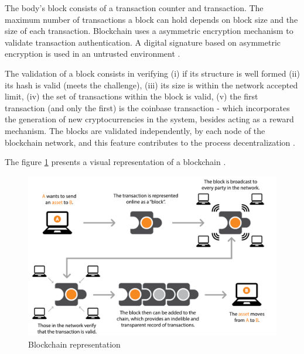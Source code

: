 The body's block consists of a transaction counter and transaction. The maximum number of transactions a block can hold depends on block size and the size of each transaction. Blockchain uses a asymmetric encryption mechanism to validate transaction authentication. A digital signature based on asymmetric encryption is used in an untrusted environment \cite{zheng2016blockchain}.

The validation of a block consists in verifying (i) if its structure is well formed (ii) its hash is valid (meets the challenge), (iii) its size is within the network accepted limit, (iv) the set of transactions within the block is valid, (v) the first transaction (and only the first) is the coinbase transaction - which incorporates the generation of new cryptocurrencies in the system, besides acting as a reward mechanism. The blocks are validated independently, by each node of the blockchain network, and this feature contributes to the process decentralization \cite{greve2018blockchain}.

The figure \ref{fig:blockchain} presents a visual representation of a blockchain \cite{tian2017supply}.

\begin{figure}[htbp]
\begin{center}
  \includegraphics[scale=0.35]{images/blockchain.png}
\caption{Blockchain representation \cite{michael2018blockchain}}
\label{fig:blockchain}
\end{center}
\end{figure}

